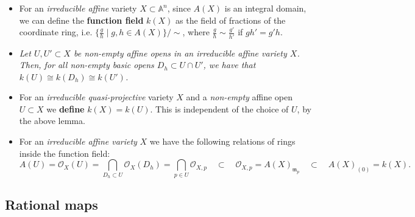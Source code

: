 \documentclass[10pt]{article}
\newcommand{\aff}{\mathbb{A}}
\begin{document}
            \begin{itemize}
                \item For an \emph{irreducible affine} variety $X\subset\aff^n$, since $A(X)$ is an integral domain, we can define the \textbf{function field} $k(X)$ as the field of fractions of the coordinate ring, i.e. $\{\frac{g}{h}\mid g,h\in A(X)\}/\sim$, where $\frac{g}{h}\sim\frac{g'}{h'}$ if $gh'=g'h$.
                \item \emph{Let $U,U'\subset X$ be \emph{non-empty} affine opens in an \emph{irreducible} affine variety $X$.}
                    \emph{Then, for all \emph{non-empty} basic opens $D_h\subset U\cap U'$, we have that $k(U)\cong k(D_h)\cong k(U')$.}
                \item For an \emph{irreducible quasi-projective} variety $X$ and a \emph{non-empty} affine open $U\subset X$ we \textbf{define} $k(X)=k(U)$.
                    This is independent of the choice of $U$, by the above lemma.
                \item For an \emph{irreducible affine variety} $X$ we have the following relations of rings inside the function field:
                    \begin{equation*}
                        A(U) = \mathcal{O}_X(U) = \bigcap_{D_h\subset U}\mathcal{O}_X(D_h) = \bigcap_{p\in U}\mathcal{O}_{X,p} \quad\subset\quad \mathcal{O}_{X,p} = A(X)_{\mathfrak{m}_p} \quad\subset\quad A(X)_{(0)} = k(X).
                    \end{equation*}
            \end{itemize}

        \subsection{Rational maps}
\end{document}
